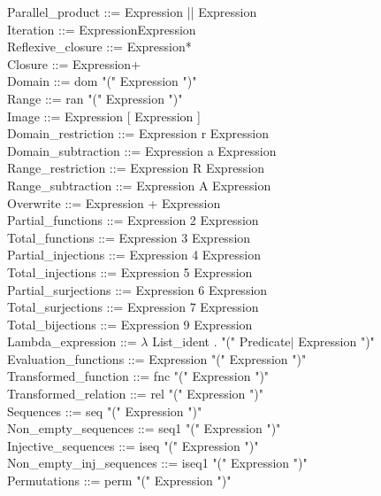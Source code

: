\documentclass[12pt,a4paper,draft]{report}
\begin{document}
{\begin{sloppypar}
Parallel\_product  ::=  Expression || Expression \\
Iteration    ::=  ExpressionExpression \\
Reflexive\_closure   ::=  Expression* \\
Closure    ::=  Expression+ \\
Domain   ::=  dom "(" Expression ")" \\
Range   ::=  ran "(" Expression ")" \\
Image    ::=  Expression [ Expression ] \\
Domain\_restriction   ::=  Expression r Expression \\
Domain\_subtraction  ::=  Expression a Expression \\
Range\_restriction   ::=  Expression R Expression \\
Range\_subtraction   ::=  Expression A Expression \\
Overwrite   ::=  Expression + Expression \\
Partial\_functions  ::=  Expression 2 Expression \\
Total\_functions  ::=  Expression 3 Expression \\
Partial\_injections  ::=  Expression 4 Expression \\
Total\_injections  ::=  Expression 5 Expression \\
Partial\_surjections  ::= Expression 6 Expression \\
Total\_surjections  ::=  Expression 7 Expression \\
Total\_bijections   ::=  Expression 9 Expression \\
Lambda\_expression   ::= $\lambda$ List\_ident . "(" Predicate$|$ Expression ")" \\
Evaluation\_functions   ::= Expression "(" Expression ")" \\
Transformed\_function   ::= fnc "(" Expression ")" \\
Transformed\_relation  ::= rel "(" Expression ")" \\
Sequences    ::= seq "(" Expression ")" \\
Non\_empty\_sequences  ::= seq1 "(" Expression ")" \\
Injective\_sequences  ::= iseq "(" Expression ")" \\
Non\_empty\_inj\_sequences  ::= iseq1 "(" Expression ")" \\
Permutations   ::= perm "(" Expression ")" \\

\end{sloppypar}}
\end{document}
